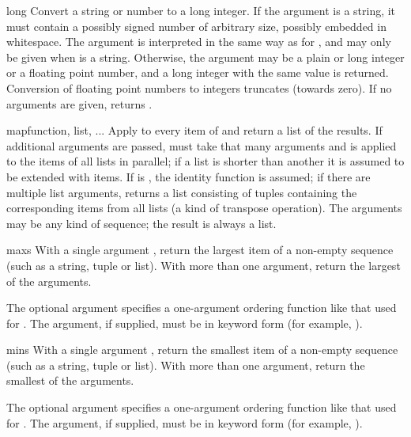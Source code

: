 \begin{funcdesc}{long}{}
  Convert a string or number to a long integer.  If the argument is a
  string, it must contain a possibly signed number of
  arbitrary size, possibly embedded in whitespace. The
   argument is interpreted in the same way as for
  , and may only be given when  is a string.
  Otherwise, the argument may be a plain or
  long integer or a floating point number, and a long integer with
  the same value is returned.    Conversion of floating
  point numbers to integers truncates (towards zero).  If no arguments
  are given, returns .
\end{funcdesc}

\begin{funcdesc}{map}{function, list, ...}
  Apply  to every item of  and return a list
  of the results.  If additional  arguments are passed,
   must take that many arguments and is applied to the
  items of all lists in parallel; if a list is shorter than another it
  is assumed to be extended with  items.  If 
  is , the identity function is assumed; if there are
  multiple list arguments,  returns a list consisting
  of tuples containing the corresponding items from all lists (a kind
  of transpose operation).  The  arguments may be any kind
  of sequence; the result is always a list.
\end{funcdesc}

\begin{funcdesc}{max}{s}
  With a single argument , return the largest item of a
  non-empty sequence (such as a string, tuple or list).  With more
  than one argument, return the largest of the arguments.

  The optional  argument specifies a one-argument ordering
  function like that used for .  The 
  argument, if supplied, must be in keyword form (for example,
  ).
\end{funcdesc}

\begin{funcdesc}{min}{s}
  With a single argument , return the smallest item of a
  non-empty sequence (such as a string, tuple or list).  With more
  than one argument, return the smallest of the arguments.

  The optional  argument specifies a one-argument ordering
  function like that used for .  The 
  argument, if supplied, must be in keyword form (for example,
  ).
\end{funcdesc}

